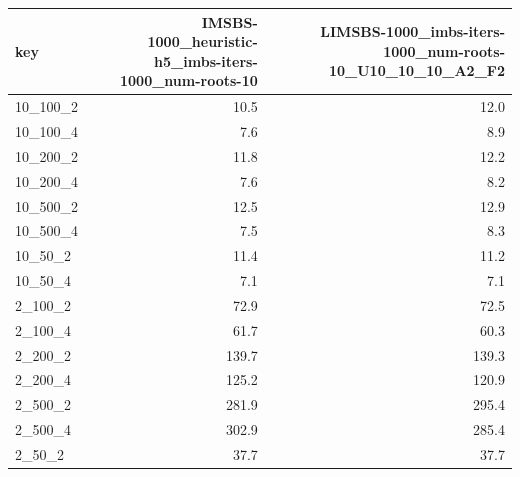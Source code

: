 \begin{tabular}{lrr}
\toprule
     key &  IMSBS-1000\_heuristic-h5\_imbs-iters-1000\_num-roots-10 &  LIMSBS-1000\_imbs-iters-1000\_num-roots-10\_U10\_10\_10\_A2\_F2 \\
\midrule
10\_100\_2 &                                               10.5 &                                               12.0 \\
10\_100\_4 &                                                7.6 &                                                8.9 \\
10\_200\_2 &                                               11.8 &                                               12.2 \\
10\_200\_4 &                                                7.6 &                                                8.2 \\
10\_500\_2 &                                               12.5 &                                               12.9 \\
10\_500\_4 &                                                7.5 &                                                8.3 \\
 10\_50\_2 &                                               11.4 &                                               11.2 \\
 10\_50\_4 &                                                7.1 &                                                7.1 \\
 2\_100\_2 &                                               72.9 &                                               72.5 \\
 2\_100\_4 &                                               61.7 &                                               60.3 \\
 2\_200\_2 &                                              139.7 &                                              139.3 \\
 2\_200\_4 &                                              125.2 &                                              120.9 \\
 2\_500\_2 &                                              281.9 &                                              295.4 \\
 2\_500\_4 &                                              302.9 &                                              285.4 \\
  2\_50\_2 &                                               37.7 &                                               37.7 \\

\end{tabular}
